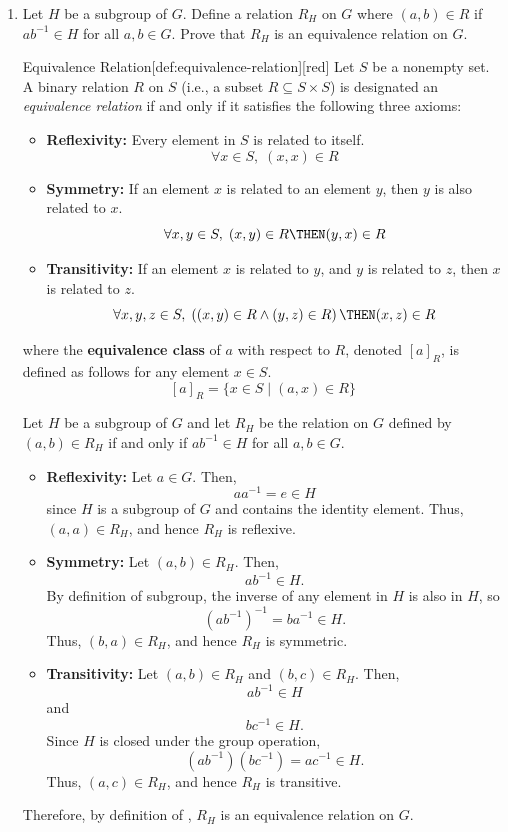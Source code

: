 \begin{enumerate}
  \newpage
  \item Let $H$ be a subgroup of $G$. Define a relation $R_H$ on $G$ 
  where $(a, b) \in R$ if $a b^{-1} \in H$ for all $a, b \in G$. 
  Prove that $R_H$ is an equivalence relation on $G$.
  \begin{define}{Equivalence Relation}[def:equivalence-relation][red]
    Let $S$ be a nonempty set. A binary relation $R$ on $S$ (i.e., a subset $R \subseteq S \times S$) is designated an \emph{equivalence relation} if and only if it satisfies the following three axioms:
    \begin{itemize}
      \item \textbf{Reflexivity:} Every element in $S$ is related to itself.
        $$ \forall x \in S, \; (x,x) \in R $$
      \item \textbf{Symmetry:} If an element $x$ is related to an element $y$, then $y$ is also related to $x$.
        $$ \forall x,y \in S, \; (x,y) \in R \THEN (y,x) \in R $$
      \item \textbf{Transitivity:} If an element $x$ is related to $y$, and $y$ is related to $z$, then $x$ is related to $z$.
        $$ \forall x,y,z \in S, \; \left( (x,y) \in R \land (y,z) \in R \right) \THEN (x,z) \in R $$
    \end{itemize}
    where the \textbf{equivalence class} of $a$ with respect to $R$, denoted $[a]_R$, is defined 
    as follows for any element $x \in S$. 
    $$
    [a]_R = \{x \in S \mid (a,x) \in R \}
    $$
  \end{define}
  \begin{subprove}
    Let $H$ be a subgroup of $G$ and let $R_H$ be the relation on $G$ defined by 
    $(a, b) \in R_H$ if and only if $a b^{-1} \in H$ for all $a, b \in G$.
    \begin{itemize}
      \item \textbf{Reflexivity:} 
        Let $a \in G$. 
        Then, 
        \[
          a a^{-1} = e \in H
        \]
        since $H$ is a subgroup of $G$ and contains the identity element.
        Thus, $(a, a) \in R_H$, and hence $R_H$ is reflexive.
      \item \textbf{Symmetry:} 
        Let $(a, b) \in R_H$. 
        Then, 
        \[
          a b^{-1} \in H.
        \]
        By definition of subgroup, the inverse of any element in $H$ is also in $H$, so
        \[
          (a b^{-1})^{-1} = b a^{-1} \in H.
        \]
        Thus, $(b, a) \in R_H$, and hence $R_H$ is symmetric.
      \item \textbf{Transitivity:} 
        Let $(a, b) \in R_H$ and $(b, c) \in R_H$. 
        Then,
        \[
          a b^{-1} \in H
        \]
        and
        \[
          b c^{-1} \in H.
        \]
        Since $H$ is closed under the group operation,
        \[
          (a b^{-1})(b c^{-1}) = a c^{-1} \in H.
        \]
        Thus, $(a, c) \in R_H$, and hence $R_H$ is transitive.
    \end{itemize}
    Therefore, by definition of , $R_H$ is an equivalence relation on $G$.
  \end{subprove}








\end{enumerate}
